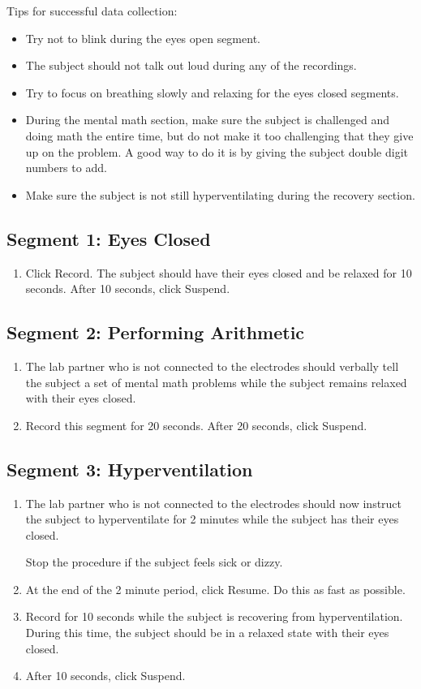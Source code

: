 \documentclass{article}
\begin{document}
Tips for successful data collection:
\begin{itemize}
	\item Try not to blink during the eyes open segment.
	\item The subject should not talk out loud during any of the recordings.
	\item Try to focus on breathing slowly and relaxing for the eyes closed segments.
	\item During the mental math section, make sure the subject is challenged and doing math the entire time, but do not make it too challenging that they give up on the problem. A good way to do it is by giving the subject double digit numbers to add.
	\item Make sure the subject is not still hyperventilating during the recovery section.
\end{itemize}

\subsection*{Segment 1: Eyes Closed}
\begin{enumerate}
	\item Click Record. The subject should have their eyes closed and be relaxed for 10 seconds. After 10 seconds, click Suspend.
\end{enumerate}

\subsection*{Segment 2: Performing Arithmetic}
\begin{enumerate}
	\item The lab partner who is not connected to the electrodes should verbally tell the subject a set of mental math problems while the subject remains relaxed with their eyes closed.
	\item Record this segment for 20 seconds. After 20 seconds, click Suspend.
\end{enumerate}

\subsection*{Segment 3: Hyperventilation}
\begin{enumerate}
	\item The lab partner who is not connected to the electrodes should now instruct the subject to hyperventilate for 2 minutes while the subject has their eyes closed.\begin{warn}
		Stop the procedure if the subject feels sick or dizzy.
	\end{warn}
	
	\item At the end of the 2 minute period, click Resume. Do this as fast as possible.
	\item Record for 10 seconds while the subject is recovering from hyperventilation. During this time, the subject should be in a relaxed state with their eyes closed.
	\item After 10 seconds, click Suspend.
\end{enumerate}
\end{document}
